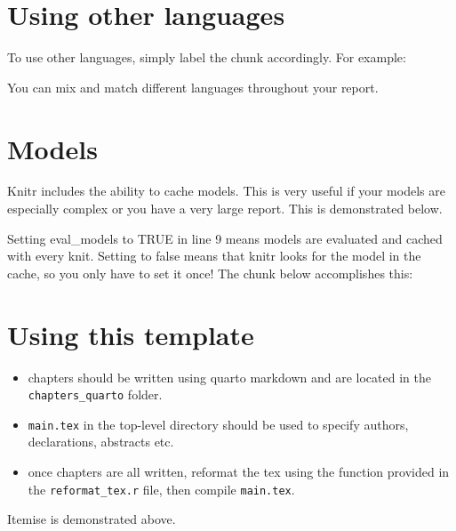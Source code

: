 \documentclass[../main.tex]{subfiles}
\begin{document}
\hypertarget{using-other-languages}{%
\section{Using other languages}\label{using-other-languages}}

To use other languages, simply label the chunk accordingly. For example:

You can mix and match different languages throughout your report.

\hypertarget{models}{%
\section{Models}\label{models}}

Knitr includes the ability to cache models. This is very useful if your
models are especially complex or you have a very large report. This is
demonstrated below.

Setting eval\_models to TRUE in line 9 means models are evaluated and
cached with every knit. Setting to false means that knitr looks for the
model in the cache, so you only have to set it once! The chunk below
accomplishes this:

\hypertarget{using-this-template}{%
\section{Using this template}\label{using-this-template}}

\begin{itemize}
\tightlist
\item
  chapters should be written using quarto markdown and are located in
  the \texttt{chapters\_quarto} folder.
\item
  \texttt{main.tex} in the top-level directory should be used to specify
  authors, declarations, abstracts etc.
\item
  once chapters are all written, reformat the tex using the function
  provided in the \texttt{reformat\_tex.r} file, then compile
  \texttt{main.tex}.
\end{itemize}

Itemise is demonstrated above.
\end{document}

